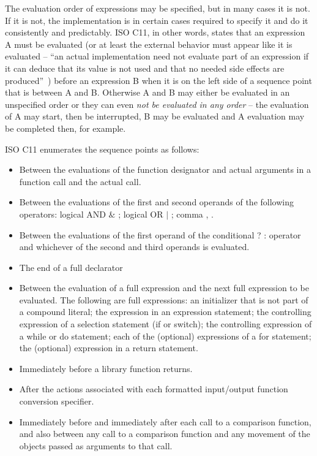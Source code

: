 The evaluation order of expressions may be specified, but in many cases it is not. If it is not, the implementation is in certain cases required to specify it and do it consistently and predictably. ISO C11, in other words, states that an expression A must be evaluated (or at least the external behavior must appear like it is evaluated -- ``an actual implementation need not evaluate part of an expression if it can deduce that its value is not used and that no needed side effects are produced''~\cite{WG14N1570}) before an expression B when it is on the left side of a sequence point that is between A and B. Otherwise A and B may either be evaluated in an unspecified order or they can even \emph{not be evaluated in any order} -- the evaluation of A may start, then be interrupted, B may be evaluated and A evaluation may be completed then, for example.

ISO C11 enumerates the sequence points as follows:~\cite{WG14N1570}
\begin{itemize}
    \item Between the evaluations of the function designator and actual arguments in a function call and the actual call.
    \item Between the evaluations of the first and second operands of the following operators: logical AND $\&$ ; logical OR $|$ ; comma , .
    \item Between the evaluations of the first operand of the conditional ? : operator and whichever of the second and third operands is evaluated.
    \item The end of a full declarator
    \item Between the evaluation of a full expression and the next full expression to be evaluated. The following are full expressions: an initializer that is not part of a compound literal; the expression in an expression statement; the
controlling expression of a selection statement (if or switch); the controlling expression of a while or do statement; each of the (optional) expressions of a for statement; the (optional) expression in a return statement.
    \item Immediately before a library function returns.
    \item After the actions associated with each formatted input/output function conversion specifier.
    \item Immediately before and immediately after each call to a comparison function, and also between any call to a comparison function and any movement of the objects passed as arguments to that call.
\end{itemize}

